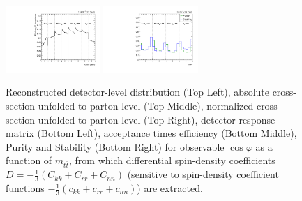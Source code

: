 \begin{figure}[htb]
\begin{center}
 \includegraphics[width=0.32\textwidth]{fig_fullRun2UL/unfolding/combined/TotEff_ll_cHel_mttbar.pdf}
 \includegraphics[width=0.32\textwidth]{fig_fullRun2UL/unfolding/combined/PurStab_ll_cHel_mttbar.pdf} \\
\caption{Reconstructed detector-level distribution (Top Left), absolute cross-section unfolded to parton-level (Top Middle), normalized cross-section unfolded to parton-level (Top Right), detector response-matrix (Bottom Left), acceptance times efficiency (Bottom Middle), Purity and Stability (Bottom Right) for  observable $\cos\varphi$ as a function of $m_{t\bar{t}}$, from which differential spin-density coefficients $D = -\frac{1}{3}(C_{kk} + C_{rr} + C_{nn})$ (sensitive to spin-density coefficient functions $-\frac{1}{3}(c_{kk} + c_{rr} + c_{nn})$) are extracted.}
\label{fig:ll_cHel_mttbar}
\end{center}
\end{figure}
\clearpage
